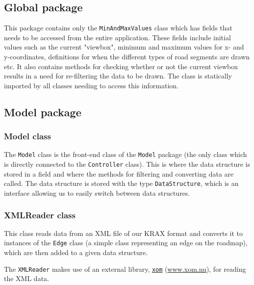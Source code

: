 \documentclass[a4paper,11pt]{article}
\begin{document}
\subsection{Global package} %
This package contains only the \texttt{MinAndMaxValues} class which has fields that needs to be accessed from the entire application. These fields include initial values such as the current "viewbox", minimum and maximum values for x- and y-coordinates, definitions for when the different types of road segments are drawn etc. It also contains methods for checking whether or not the current viewbox results in a need for re-filtering the data to be drawn. The class is statically imported by all classes needing to access this information.

\subsection{Model package} %

\subsubsection{Model class} %
The \texttt{Model} class is the front-end class of the \texttt{Model} package (the only class which is directly connected to the \texttt{Controller} class). This is where the data structure is stored in a field and where the methods for filtering and converting data are called. The data structure is stored with the type \texttt{DataStructure}, which is an interface allowing us to easily switch between data structures.

\subsubsection{XMLReader class} %
This class reads data from an XML file of our KRAX format and converts it to instances of the \texttt{Edge} class (a simple class representing an edge on the roadmap), which are then added to a given data structure.

The \texttt{XMLReader} makes use of an external library, \href{www.xom.nu}{\texttt{xom}} (\url{www.xom.nu}), for reading the XML data.
\end{document}
